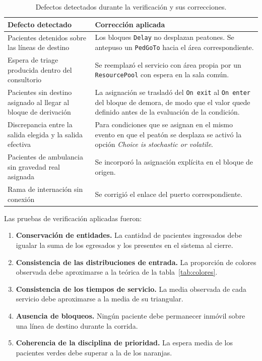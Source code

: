 \begin{table}[H]
\centering
\small
\begin{tabular}{p{5.4cm}p{8.4cm}}
\toprule
\textbf{Defecto detectado} & \textbf{Corrección aplicada} \\
\midrule
Pacientes detenidos sobre las líneas de destino &
Los bloques \texttt{Delay} no desplazan peatones. Se antepuso un
\texttt{PedGoTo} hacia el área correspondiente. \\
Espera de triage producida dentro del consultorio &
Se reemplazó el servicio con área propia por un \texttt{ResourcePool} con
espera en la sala común. \\
Pacientes sin destino asignado al llegar al bloque de derivación &
La asignación se trasladó del \texttt{On exit} al \texttt{On enter} del
bloque de demora, de modo que el valor quede definido antes de la evaluación
de la condición. \\
Discrepancia entre la salida elegida y la salida efectiva &
Para condiciones que se asignan en el mismo evento en que el peatón se
desplaza se activó la opción \emph{Choice is stochastic or volatile}. \\
Pacientes de ambulancia sin gravedad real asignada &
Se incorporó la asignación explícita en el bloque de origen. \\
Rama de internación sin conexión &
Se corrigió el enlace del puerto correspondiente. \\
\bottomrule
\end{tabular}
\caption{Defectos detectados durante la verificación y sus correcciones.}
\end{table}

Las pruebas de verificación aplicadas fueron:

\begin{enumerate}
  \item \textbf{Conservación de entidades.} La cantidad de pacientes
  ingresados debe igualar la suma de los egresados y los presentes en el
  sistema al cierre.
  \item \textbf{Consistencia de las distribuciones de entrada.} La proporción
  de colores observada debe aproximarse a la teórica de la
  tabla~\ref{tab:colores}.
  \item \textbf{Consistencia de los tiempos de servicio.} La media observada
  de cada servicio debe aproximarse a la media de su triangular.
  \item \textbf{Ausencia de bloqueos.} Ningún paciente debe permanecer
  inmóvil sobre una línea de destino durante la corrida.
  \item \textbf{Coherencia de la disciplina de prioridad.} La espera media de
  los pacientes verdes debe superar a la de los naranjas.
\end{enumerate}

